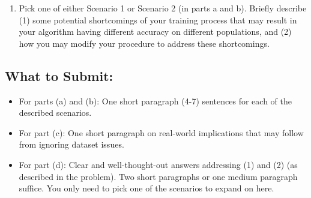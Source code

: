 \documentclass{article}
\begin{document}
\begin{aprob}
\begin{enumerate}
\item {} Pick one of either Scenario 1 or Scenario 2 (in parts a and b). Briefly describe (1) some potential shortcomings of your training process that may result in your algorithm having different accuracy on different populations, and (2) how you may modify your procedure to address these shortcomings.

\end{enumerate}

\medskip

\subsection*{What to Submit:}
\begin{itemize}
    \item For parts (a) and (b): One short paragraph (4-7) sentences for each of the described scenarios.
    \item For part (c): One short paragraph on real-world implications that may follow from ignoring dataset issues.
    \item For part (d): Clear and well-thought-out answers addressing (1) and (2) (as described in the problem). Two short paragraphs or one medium paragraph suffice. You only need to pick one of the scenarios to expand on here.
\end{itemize}
\end{aprob}
\end{document}

